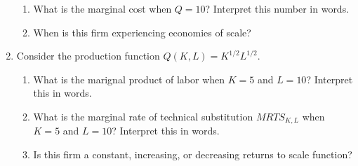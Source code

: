 \documentclass[11pt]{article}
\newcommand{\answer}[1]{\iftoggle{INCLUDEANSWERS}{{\color{violet!70!white}\textbf{Solution:} #1}}{} }
\newcommand{\points}[1]{\iftoggle{INCLUDEPOINTS}{{\color{blue!70!white}(#1 pts.)}}{}}
\begin{document}
\begin{enumerate}
\begin{enumerate}
    \item \points{10} What is the marginal cost when $Q = 10$? Interpret this number in words.
    
    \item \points{10} When is this firm experiencing economies of scale?
  \end{enumerate}

  \answer{
    \begin{enumerate}
      \item $MC(Q) = \partial TC(Q) / \partial Q = 5Q + 4$ and $ATC(Q) = TC(Q) / Q = 2.5Q + 4 + 40/Q$.
      \item $MC(10) = 5 * 10 + 4 = 54$. This means the 10th unit cost \$54 to produce.
      \item The minimum efficient scale is given by $MC(Q) = ATC(Q)$.
      $$
        5Q + 4 = 2.5Q + 4 + 40/Q \implies Q^{MES} = 4
      $$
      Therefore, the firm is experiencing economies of scale when $Q < 4$. 
    \end{enumerate}
  }

  \item Consider the production function $Q(K,L) = K^{1/2}L^{1/2}$.
  \begin{enumerate}
    \item \points{5} What is the marignal product of labor when $K = 5$ and $L = 10$? Interpret this in words.

    \item \points{10} What is the marginal rate of technical substitution $MRTS_{K,L}$ when $K = 5$ and $L = 10$? Interpret this in words.
    
    \item \points{10} Is this firm a constant, increasing, or decreasing returns to scale function?
  \end{enumerate}

  \answer{
    \begin{enumerate}
      \item $MP_L(K, L) = 1/2 L^{-1/2}K^{1/2}$. $MP_L(5, 10) = 1/2 * \sqrt{5} / \sqrt{10} = \sqrt{2}/4$. This implies at $K = 5$ and $L = 10$, increasing labor by 1 unit increases output by $\sqrt{2}/4$ units.
      
      \item $MP_K(K, L) = 1/2 K^{-1/2}L^{1/2}$. This implies 
      $$
        MRTS_{K,L} = \frac{MP_K}{MP_L} = \frac{1/2 K^{-1/2}L^{1/2}}{1/2 L^{-1/2}K^{1/2}} = \frac{L}{K} = 2
      $$
      To interpret, when $K = 5$ and $L = 10$, giving up one unit of labor requires $2$ units of capital to keep output constant


\end{enumerate}}
\end{enumerate}
\end{document}

